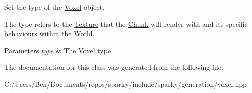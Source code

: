 Set the type of the \hyperlink{classsparky_1_1_voxel}{Voxel} object. 

The type refers to the \hyperlink{classsparky_1_1_texture}{Texture} that the \hyperlink{classsparky_1_1_chunk}{Chunk} will render with and it\textquotesingle{}s specific behaviours within the \hyperlink{classsparky_1_1_world}{World}.


\begin{DoxyParams}{Parameters}
{\em type} & The \hyperlink{classsparky_1_1_voxel}{Voxel} type. \\
\hline
\end{DoxyParams}


The documentation for this class was generated from the following file\+:\begin{DoxyCompactItemize}
\item 
C\+:/\+Users/\+Ben/\+Documents/repos/sparky/include/sparky/generation/voxel.\+hpp\end{DoxyCompactItemize}
